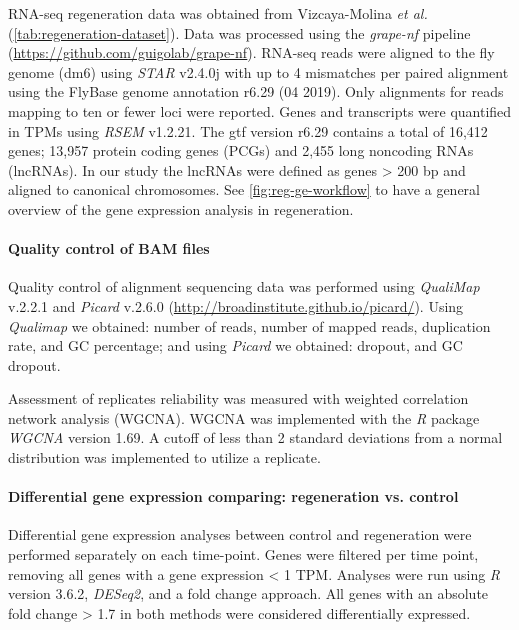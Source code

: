 RNA-seq regeneration data was obtained from Vizcaya-Molina \textit{et al.}\autocite{vizcaya_2018} (\autoref{tab:regeneration-dataset}). Data was processed using the \textit{grape-nf} pipeline (\url{https://github.com/guigolab/grape-nf}). RNA-seq reads were aligned to the fly genome (dm6) using \textit{STAR} \autocite{dobin_2013_star} v2.4.0j with up to 4 mismatches per paired alignment using the FlyBase genome annotation r6.29 (04 2019). Only alignments for reads mapping to ten or fewer loci were reported. Genes and transcripts were quantified in TPMs using \textit{RSEM} \autocite{li_2011_rsem} v1.2.21.  The gtf version r6.29 contains a total of 16,412 genes; 13,957 protein coding genes (PCGs) and 2,455 long noncoding RNAs (lncRNAs). In our study the lncRNAs were defined as genes > 200 bp and aligned to canonical chromosomes. See \autoref{fig:reg-ge-workflow} to have a general overview of the gene expression analysis in regeneration. 

\paragraph{Quality control of BAM files}
\label{sec:rna_seq_quality_control_of_bam_files}

Quality control of alignment sequencing data was performed using \textit{QualiMap} \autocite{garcia_2012_qualimap} v.2.2.1 and \textit{Picard} v.2.6.0 (\url{http://broadinstitute.github.io/picard/}). Using \textit{Qualimap} we obtained: number of reads, number of mapped reads, duplication rate, and GC percentage; and using \textit{Picard} we obtained: dropout, and GC dropout.

Assessment of  replicates reliability was measured with weighted correlation network analysis (WGCNA). WGCNA was implemented with the \textit{R} package \textit{WGCNA}\autocite{langfelder_wgcna} version 1.69. A cutoff of less than 2 standard deviations from a normal distribution was implemented to utilize a replicate.

\paragraph{Differential gene expression comparing: regeneration vs. control}
\label{sec:differential_expression_analysis}

Differential gene expression analyses between control and regeneration were performed separately on each time-point. Genes were filtered per time point, removing all genes with a gene expression < 1 TPM. Analyses were run using \textit{R} version 3.6.2, \textit{DESeq2}\autocite{love_2014_deseq2}, and a fold change\autocite{vizcaya_2018} approach. All genes with an absolute fold change > 1.7 in both methods were considered differentially expressed.

